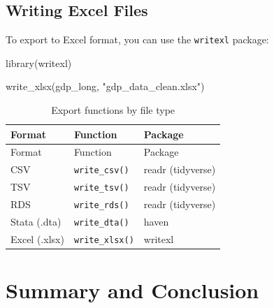 \documentclass[
  letterpaper,
  DIV=11,
  numbers=noendperiod]{scrreprt}
\newenvironment{Shaded}{\begin{snugshade}}{\end{snugshade}}
\newcommand{\FunctionTok}[1]{\textcolor[rgb]{0.28,0.35,0.67}{#1}}
\newcommand{\NormalTok}[1]{\textcolor[rgb]{0.00,0.23,0.31}{#1}}
\newcommand{\StringTok}[1]{\textcolor[rgb]{0.13,0.47,0.30}{#1}}
\begin{document}
\subsection{Writing Excel Files}\label{writing-excel-files}

To export to Excel format, you can use the \texttt{writexl} package:

\begin{Shaded}
\begin{Highlighting}[]
\FunctionTok{library}\NormalTok{(writexl)}

\FunctionTok{write\_xlsx}\NormalTok{(gdp\_long, }\StringTok{"gdp\_data\_clean.xlsx"}\NormalTok{)}
\end{Highlighting}
\end{Shaded}

\begin{tcolorbox}[enhanced jigsaw, arc=.35mm, bottomrule=.15mm, bottomtitle=1mm, breakable, colback=white, colbacktitle=quarto-callout-tip-color!10!white, colframe=quarto-callout-tip-color-frame, coltitle=black, left=2mm, leftrule=.75mm, opacityback=0, opacitybacktitle=0.6, rightrule=.15mm, title=\textcolor{quarto-callout-tip-color}{\faLightbulb}\hspace{0.5em}{Export Function Quick Reference}, titlerule=0mm, toprule=.15mm, toptitle=1mm]

\begin{longtable}[]{@{}lll@{}}
\caption{Export functions by file
type}\label{tbl-export-functions}\tabularnewline
\toprule\noalign{}
Format & Function & Package \\
\midrule\noalign{}
\endfirsthead
\toprule\noalign{}
Format & Function & Package \\
\midrule\noalign{}
\endhead
\bottomrule\noalign{}
\endlastfoot
CSV & \texttt{write\_csv()} & readr (tidyverse) \\
TSV & \texttt{write\_tsv()} & readr (tidyverse) \\
RDS & \texttt{write\_rds()} & readr (tidyverse) \\
Stata (.dta) & \texttt{write\_dta()} & haven \\
Excel (.xlsx) & \texttt{write\_xlsx()} & writexl \\
\end{longtable}

\end{tcolorbox}

\section{Summary and Conclusion}\label{summary-and-conclusion-4}
\end{document}
